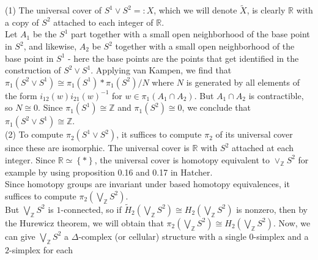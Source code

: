     \begin{solution}
        (1) 
        The universal cover of $S^{1} \vee S^2 =: X$, which
        we will denote $\tilde{X}$, is
        clearly
        $\mathbb{R}$ with a copy of $S^2$ attached to
        each integer of $\mathbb{R}$.\\
        Let 
        $A_1$ be the $S^{1}$ part
        together with a small open neighborhood
        of the base point in $S^2$, and
        likewise, $A_2$ be $S^2$ together with a small
        open neighborhood of the base point in $S^{1}$ - here
        the base points are the points that get identified
        in the construction of $S^2 \vee S^{1}$.
        Applying van Kampen, we find that
        $\pi_1 \left( S^2 \vee S^{1} \right) 
        \cong \pi_1 \left( S^{1} \right) * \pi_1\left( S^2 \right) 
        / N$ where $N$ is generated
        by all elements of the form
        $i_{12}(w) i_{21}(w)^{-1}$ for
        $w \in \pi_1 \left( A_1 \cap A_2 \right) $.
        But $A_1 \cap A_2$ is contractible, so
        $N \cong 0$. Since $\pi_1 \left( S^{1} \right) \cong
        \mathbb{Z}$ and $\pi_1 \left( S^2 \right) \cong 0$, 
        we conclude that $\pi_1 \left( S^{2} \vee S^{1}  \right) 
        \cong \mathbb{Z}$.\\
        \linebreak
        (2) To compute
        $\pi_2 \left( S^{1} \vee S^2 \right) $, it suffices
        to compute $\pi_2$ of its universal cover since
        these are isomorphic. The universal cover
        is $\mathbb{R}$ with $S^2$ attached at each integer.
        Since $\mathbb{R} \simeq \left\{ * \right\}$, the
        universal cover is homotopy equivalent to
        $\vee_{\mathbb{Z}} S^2$ for example by
        using proposition 0.16 and 0.17 in Hatcher.\\
        Since homotopy groups are invariant under based homotopy
        equivalences, it suffices to
        compute $\pi_2 \left( \bigvee_{\mathbb{Z}}S^{2} \right) $.\\
        But $\bigvee_{\mathbb{Z}}S^2$ is $1$-connected,
        so if $\tilde{H}_2 \left( \bigvee_{\mathbb{Z}}S^2 \right) 
        \cong H_2 \left( \bigvee_{\mathbb{Z}}S^2 \right) $ 
        is nonzero, then by the Hurewicz theorem,
        we will obtain that 
        $\pi_2\left( \bigvee_{\mathbb{Z}}S^2 \right) 
        \cong H_2 \left( \bigvee_{\mathbb{Z}}S^2 \right) $.
        Now, we can give
        $\bigvee_{\mathbb{Z}}S^2$ a $\Delta$-complex (or
        cellular) structure
        with a single $0$-simplex
        and a $2$-simplex for each

\end{solution}
